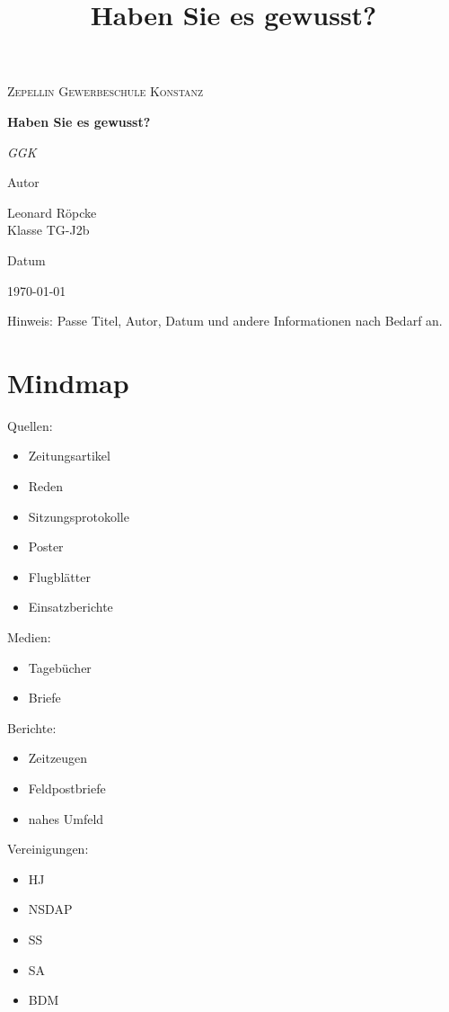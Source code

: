 \documentclass{article}
\title{Haben Sie es gewusst?}
\newcommand{\AuthorName}{Leonard Röpcke\\Klasse TG-J2b}
\newcommand{\Institute}{Zepellin Gewerbeschule Konstanz}
\newcommand{\Subtitle}{GGK}
\newcommand{\MyDate}{\today}
\begin{document}
\begin{titlepage}
  \centering
  {\scshape\LARGE \Institute \par}
  \vspace{2.5cm}
  {\huge\bfseries Haben Sie es gewusst?\par}
  \vspace{0.8cm}
  {\Large\itshape \Subtitle \par}
  \vfill
  {\Large Autor\par}
  {\Large \AuthorName \par}
  \vspace{1cm}
  {\Large Datum\par}
  {\Large \MyDate \par}
  \vfill
  \vspace{1cm}
  {\small Hinweis: Passe Titel, Autor, Datum und andere Informationen nach Bedarf an.}
\end{titlepage}


\section*{Mindmap}
Quellen:
\begin{itemize}
    \item Zeitungsartikel
    \item Reden
    \item Sitzungsprotokolle
    \item Poster
    \item Flugblätter
    \item Einsatzberichte
\end{itemize}
Medien:
\begin{itemize}
    \item Tagebücher
    \item Briefe
\end{itemize}
Berichte:
\begin{itemize}
    \item Zeitzeugen
    \item Feldpostbriefe
    \item nahes Umfeld
\end{itemize}
Vereinigungen:
\begin{itemize}
    \item HJ
    \item NSDAP
    \item SS
    \item SA
    \item BDM
\end{itemize}
\end{document}
